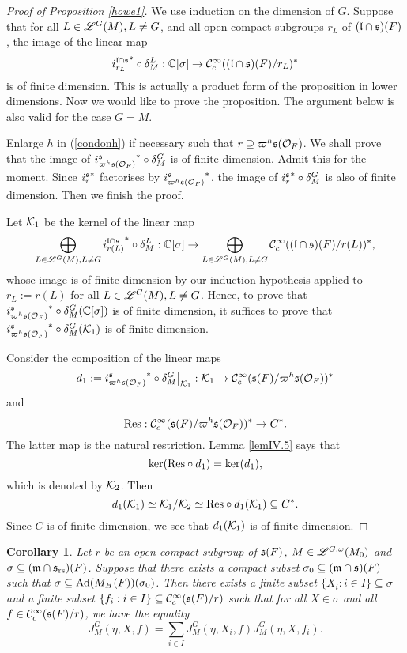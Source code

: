 \documentclass[a4paper]{amsart}
\newcommand{\fm}{{\mathfrak{m}}} \newcommand{\fn}{{\mathfrak{n}}}\newcommand{\fo}{{\mathfrak{o}}} \newcommand{\fp}{{\mathfrak{p}}}
\newtheorem{coro}[thm]{Corollary}
\theoremstyle{definition}
\theoremstyle{remark}
\numberwithin{equation}{subsection}
\begin{document}
\begin{proof}[Proof of Proposition \ref{howe1}]
We use induction on the dimension of $G$. Suppose that for all $L\in\mathscr{L}^G(M), L\neq G$, and all open compact subgroups $r_L$ of $({\mathfrak{l}}\cap{\mathfrak{s}})(F)$, the image of the linear map 
$$ {i_{r_L}^{{\mathfrak{l}}\cap{\mathfrak{s}}}}^\ast\circ\delta_M^L:{\mathbb {C}}[\sigma]\rightarrow{\mathcal {C}}_c^\infty(({\mathfrak{l}}\cap{\mathfrak{s}})(F)/r_L)^\ast $$ 
is of finite dimension. This is actually a product form of the proposition in lower dimensions. Now we would like to prove the proposition. The argument below is also valid for the case $G=M$. 

Enlarge $h$ in (\ref{condonh}) if necessary such that $r\supseteq\varpi^h{\mathfrak{s}}({\mathcal {O}}_F)$. We shall prove that the image of ${i_{\varpi^h{\mathfrak{s}}({\mathcal {O}}_F)}^{\mathfrak{s}}}^*\circ\delta_M^G$ is of finite dimension. Admit this for the moment. Since ${i_r^{\mathfrak{s}}}^*$ factorises by ${i_{\varpi^h{\mathfrak{s}}({\mathcal {O}}_F)}^{\mathfrak{s}}}^*$, the image of ${i_r^{\mathfrak{s}}}^*\circ\delta_M^G$ is also of finite dimension. Then we finish the proof. 

Let ${\mathcal {K}}_1$ be the kernel of the linear map
$$ \bigoplus_{L\in\mathscr{L}^G(M),L\neq G} {i_{r(L)}^{{\mathfrak{l}}\cap{\mathfrak{s}}}}^\ast\circ\delta_M^L: {\mathbb {C}}[\sigma]\rightarrow\bigoplus_{L\in\mathscr{L}^G(M),L\neq G}{\mathcal {C}}_c^\infty(({\mathfrak{l}}\cap{\mathfrak{s}})(F)/r(L))^\ast, $$
whose image is of finite dimension by our induction hypothesis applied to $r_L:=r(L)$ for all $L\in\mathscr{L}^G(M),L\neq G$. Hence, to prove that ${i_{\varpi^h{\mathfrak{s}}({\mathcal {O}}_F)}^{\mathfrak{s}}}^*\circ\delta_M^G({\mathbb {C}}[\sigma])$ is of finite dimension, it suffices to prove that ${i_{\varpi^h{\mathfrak{s}}({\mathcal {O}}_F)}^{\mathfrak{s}}}^*\circ\delta_M^G({\mathcal {K}}_1)$ is of finite dimension. 

Consider the composition of the linear maps
$$ d_1:={i_{\varpi^h{\mathfrak{s}}({\mathcal {O}}_F)}^{\mathfrak{s}}}^*\circ\delta_M^G\big|_{{\mathcal {K}}_1}: {\mathcal {K}}_1\rightarrow{\mathcal {C}}_c^\infty({\mathfrak{s}}(F)/\varpi^h{\mathfrak{s}}({\mathcal {O}}_F))^\ast $$
and
$$ {\mathrm{Res}}: {\mathcal {C}}_c^\infty({\mathfrak{s}}(F)/\varpi^h{\mathfrak{s}}({\mathcal {O}}_F))^\ast\rightarrow C^\ast. $$
The latter map is the natural restriction. Lemma \ref{lemIV.5} says that
$$ \ker({\mathrm{Res}}\circ d_1)=\ker(d_1), $$
which is denoted by ${\mathcal {K}}_2$. Then
$$ d_1({\mathcal {K}}_1)\simeq{\mathcal {K}}_1/{\mathcal {K}}_2\simeq{\mathrm{Res}}\circ d_1({\mathcal {K}}_1)\subseteq C^\ast. $$
Since $C$ is of finite dimension, we see that $d_1({\mathcal {K}}_1)$ is of finite dimension. 
\end{proof}

\begin{coro}\label{corhowe1}
Let $r$ be an open compact subgroup of ${\mathfrak{s}}(F)$, $M\in\mathscr{L}^{G,\omega}(M_0)$ and $\sigma\subseteq (\fm\cap\fs_\rs)(F)$. Suppose that there exists a compact subset $\sigma_0\subseteq(\fm\cap\fs)(F)$ such that $\sigma\subseteq {\mathrm{Ad}}(M_H(F))(\sigma_0)$. Then there exists a finite subset $\{X_i: i\in I\}\subseteq\sigma$ and a finite subset $\{f_i: i\in I\}\subseteq{\mathcal {C}}_c^\infty({\mathfrak{s}}(F)/r)$ such that for all $X\in\sigma$ and all $f\in{\mathcal {C}}_c^\infty({\mathfrak{s}}(F)/r)$, we have the equality
$$ J_M^G(\eta, X, f)=\sum_{i\in I} J_M^G(\eta, X_i, f) J_M^G(\eta, X, f_i). $$
\end{coro}
\end{document}
